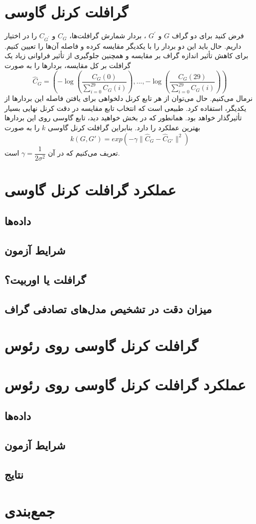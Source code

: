 \section{گرافلت کرنل گاوسی}
فرض کنید برای دو گراف $G$ و $G^\prime$ ، بردار شمارش گرافلت‌ها، $C_G$ و $C_{G^\prime}$ را در اختیار داریم. حال باید این دو بردار را با یکدیگر مقایسه کرده و فاصله آن‌ها را تعیین کنیم. برای کاهش تأثیر اندازه گراف‌ بر مقایسه و همچنین جلوگیری از تأثیر فراوانی زیاد یک گرافلت بر کل مقایسه، بردارها را به صورت
\begin{equation}
\label{eq:feature-vector}
\hat{C}_G = (-\log(\dfrac{C_G(0)}{\sum _{i=0}^{29} C_G(i)}),...,-\log(\dfrac{C_G(29)}{\sum _{i=0}^{29} C_G(i)}))
\end{equation}
نرمال می‌کنیم. حال می‌توان از هر تابع کرنل دلخواهی برای یافتن فاصله این بردارها از یکدیگر، استفاده کرد. طبیعی است که انتخاب تابع مقایسه در دقت کرنل نهایی بسیار تأثیرگذار خواهد بود. همانطور که در بخش  خواهید دید، تابع گاوسی روی این بردارها بهترین عملکرد را دارد. بنابراین گرافلت کرنل گاوسی $k$ را به صورت
\begin{equation}
\label{eqn:kernelfunction}
k(G,G') = exp(-\gamma\parallel \hat{C}_G - \hat{C}_{G'}\parallel^2)
\end{equation}
تعریف می‌کنیم که در آن $\gamma = \dfrac{1}{2\sigma^2}$ است.

\section{عملکرد گرافلت کرنل گاوسی}
\subsection{داده‌‌ها}
\subsection{شرایط آزمون}
\subsection{گرافلت یا اوربیت؟}\label{sec:graphlet-vs-orbit}
\subsection{میزان دقت در تشخیص مدل‌های تصادفی گراف}

\section{گرافلت کرنل گاوسی روی رئوس}
\section{عملکرد گرافلت کرنل گاوسی روی رئوس}
\subsection{داده‌ها}
\subsection{شرایط آزمون}
\subsection{نتایج}

\section{جمع‌بندی}